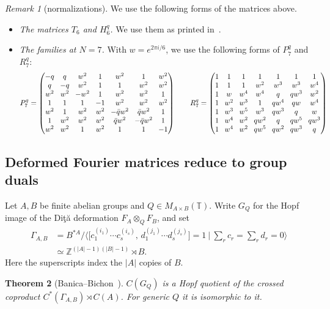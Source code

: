 \documentclass[11pt]{amsart}
\newtheorem{theorem}{Theorem}[section]
\theoremstyle{definition}
\theoremstyle{remark}
\newtheorem{remark}[theorem]{Remark}
\theoremstyle{plain}
\numberwithin{equation}{section}
\numberwithin{table}{section}
\newcommand{\Z}{\mathbb Z}
\newcommand{\T}{\mathbb T}
\begin{document}
\begin{remark}[normalizations]
We use the following forms of the matrices above.
\begin{itemize}
\item \emph{The matrices $T_6$ and $H_6^q$.} We use them as printed in~\cite[\S5]{bbs}.
\item \emph{The families at $N=7$.} With $w=e^{2\pi i/6}$, we use the following forms of $P_7^q$ and $R_7^q$:
\[
{\setlength{\arraycolsep}{4pt}
P_7^q=\begin{pmatrix}-q&q&w^2&1&w^2&1&w^2\\q&-q&w^2&1&1&w^2&w^2\\w^2&w^2&-w^2&1&w^2&w^2&1\\1&1&1&-1&w^2&w^2&w^2\\w^2&1&w^2&w^2&-\bar qw^2&\bar qw^2&1\\1&w^2&w^2&w^2&\bar qw^2&-\bar qw^2&1\\w^2&w^2&1&w^2&1&1&-1\end{pmatrix}
\qquad
R_7^q=\begin{pmatrix}1&1&1&1&1&1&1\\1&1&1&w^2&w^3&w^3&w^4\\1&w&w^4&w^4&q&qw^3&w^2\\1&w^2&w^3&1&qw^4&qw&w^4\\1&w^3&w^5&w^3&qw^3&q&w\\1&w^4&w^2&qw^2&q&qw^5&qw^3\\1&w^4&w^2&qw^5&qw^2&qw^3&q\end{pmatrix}}
\]
\end{itemize}
\end{remark}

\subsection{Deformed Fourier matrices reduce to group duals}

Let $A,B$ be finite abelian groups and $Q\in M_{A\times B}(\T)$. Write $G_Q$ for the Hopf image of the Di{\c t}{\u a} deformation $F_A\otimes_QF_B$, and set
\begin{align*}
\Gamma_{A,B}&=B^{*A}\Big/\Big\langle\big[c_1^{(i_1)}\cdots c_s^{(i_s)},\,d_1^{(j_1)}\cdots d_s^{(j_s)}\big]=1\ \Big|\ \textstyle\sum_rc_r=\sum_rd_r=0\Big\rangle\\
&\simeq\Z^{(|A|-1)(|B|-1)}\rtimes B .
\end{align*}
Here the superscripts index the $|A|$ copies of $B$.

\begin{theorem}[Banica--Bichon~\cite{bbrw}]\label{thm:bbrw}
$C(G_Q)$ is a Hopf quotient of the crossed coproduct $C^*(\Gamma_{A,B})\rtimes C(A)$. For generic $Q$ it is isomorphic to it.
\end{theorem}
\end{document}
